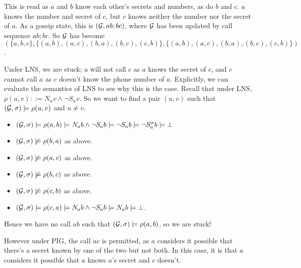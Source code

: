 \documentclass[12pt, a4paper]{article} %
\begin{document}
\begin{center}
\end{center}

This is read as $a$ and $b$ know each other's secrets and numbers, as do $b$ and $c$. $a$ knows the number and secret of $c$, but $c$ knows neither the number nor the secret of $a$. As a gossip state, this is $(\mathcal{G}, ab; bc)$, where $\mathcal{G}$ has been updated by call sequence $ab; bc$. So $\mathcal{G}$ has become $(\{a, b, c\}, \{(a, b), (a, c), (b, a), (b, c), (c, b)\}, \{(a, b), (a, c), (b, a), (b, c), (c, b)\})$.

Under \textsf{LNS}, we are stuck; $a$ will not call $c$ as $a$ knows the secret of $c$, and $c$ cannot call $a$ as $c$ doesn't know the phone number of $a$. Explicitly, we can evaluate the semantics of \textsf{LNS} to see why this is the case. Recall that under \textsf{LNS}, $\rho(u, v) ::= N_u v \land \neg S_u v$. So we want to find a pair $(u, v)$ such that $\left(\mathcal{G}, \sigma\right) \models \rho(u, v)$ and $u \not = v$.

\begin{itemize}
    \item $\left(\mathcal{G}, \sigma\right) \models \rho(a, b) \models N_a b \land \neg S_a b \models \neg S_a b \models \neg S_a^\sigma b \models \bot$
    \item $\left(\mathcal{G}, \sigma\right) \not \models \rho(b, a)$ as above.
    \item $\left(\mathcal{G}, \sigma\right) \not \models \rho(a, c)$ as above.
    \item $\left(\mathcal{G}, \sigma\right) \not \models \rho(b, c)$ as above.
    \item $\left(\mathcal{G}, \sigma\right) \not \models \rho(c, b)$ as above.
    \item $\left(\mathcal{G}, \sigma\right) \models \rho(c, a) \models N_a b \land \neg S_a b \models N_a b \models \bot$.
\end{itemize}

Hence we have no call $ab$ such that $(\mathcal{G}, \sigma) \models \rho(a, b)$, so we are stuck!

However under \textsf{PIG}, the call $ac$ is permitted, as $a$ considers it possible that there's a secret known by one of the two but not both. In this case, it is that $a$ considers it possible that $a$ knows $a$'s secret and $c$ doesn't.
\end{document}
